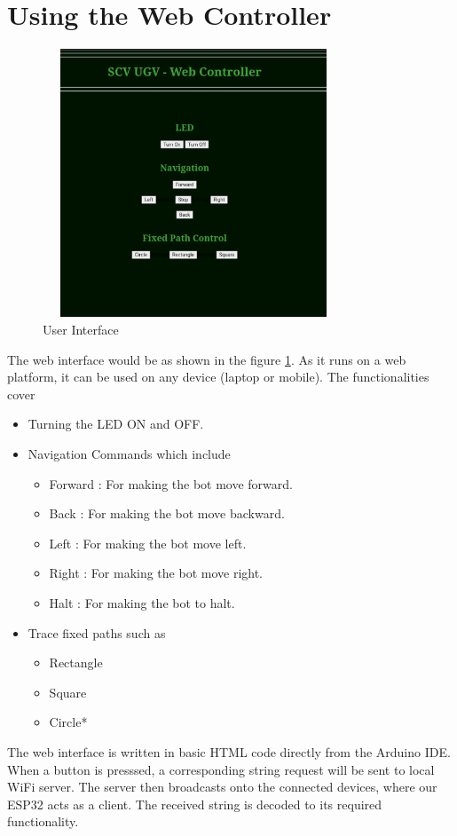 \documentclass[journal,12pt,twocolumn]{IEEEtran}
\begin{document}
\section{Using the Web Controller}
\begin{figure}[h]
    \centering
    \includegraphics[width=9cm,height=8cm]{figs/web_interface.jpg}
    \caption{User Interface}
    \label{fig:web_interface}
\end{figure}
The web interface would be as shown in the figure \ref{fig:web_interface}. As it runs on a web platform, it can be used on any device (laptop or mobile). The functionalities cover
\begin{itemize}
    \item Turning the LED ON and OFF.
    \item Navigation Commands which include 
    \begin{itemize}
        \item Forward : For making the bot move forward.
        \item Back : For making the bot move backward.
        \item Left : For making the bot move left.
        \item Right : For making the bot move right.
        \item Halt : For making the bot to halt.
    \end{itemize}
    \item Trace fixed paths such as 
    \begin{itemize}
        \item Rectangle
        \item Square
        \item Circle*
    \end{itemize}
\end{itemize}
The web interface is written in basic HTML code directly from the Arduino IDE. When a button is presssed, a corresponding string request will be sent to local WiFi server. The server then broadcasts onto the connected devices, where our ESP32 acts as a client. The received string is decoded to its required functionality. 
\end{document}
